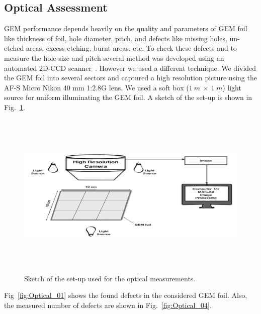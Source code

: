 \subsection{Optical Assessment}
GEM performance depends heavily on the quality and parameters of GEM foil like thickness of foil, hole diameter, pitch, and defects like missing holes, un-etched areas, excess-etching, burnt areas, etc. 
To check these defects and to measure the hole-size and pitch several method was developed using an automated 2D-CCD scanner~\cite{Posik2015, Becker2006}. 
However we used a different technique. We divided the GEM foil into several sectors and captured a high resolution picture using the AF-S Micro Nikon 40 mm 1:2.8G lens. We used a soft box ($1~m~\times~1~m$) light source for uniform illuminating the GEM foil.
A sketch of the set-up is shown in Fig.~\ref{fig:Optical_Sketch}.
\begin{figure}[!htbp]
    \centering
        \includegraphics[width=12cm, height=8cm]{figures/GEM/figures/2.jpeg}
   \caption{Sketch of the set-up used for the optical measurements.}   \label{fig:Optical_Sketch}
\end{figure}
Fig~\ref{fig:Optical_01} shows the found defects in the considered GEM foil. Also, the measured number of defects are shown in Fig.~\ref{fig:Optical_04}.
